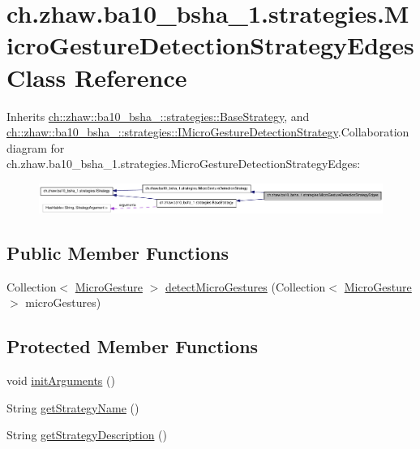 \hypertarget{classch_1_1zhaw_1_1ba10__bsha__1_1_1strategies_1_1MicroGestureDetectionStrategyEdges}{
\section{ch.zhaw.ba10\_\-bsha\_\-1.strategies.MicroGestureDetectionStrategyEdges Class Reference}
\label{classch_1_1zhaw_1_1ba10__bsha__1_1_1strategies_1_1MicroGestureDetectionStrategyEdges}
}


Inherits \hyperlink{classch_1_1zhaw_1_1ba10__bsha__1_1_1strategies_1_1BaseStrategy}{ch::zhaw::ba10\_\-bsha\_::strategies::BaseStrategy}, and \hyperlink{interfacech_1_1zhaw_1_1ba10__bsha__1_1_1strategies_1_1IMicroGestureDetectionStrategy}{ch::zhaw::ba10\_\-bsha\_::strategies::IMicroGestureDetectionStrategy}.Collaboration diagram for ch.zhaw.ba10\_\-bsha\_\-1.strategies.MicroGestureDetectionStrategyEdges:\nopagebreak
\begin{figure}[H]
\begin{center}
\leavevmode
\includegraphics[width=400pt]{classch_1_1zhaw_1_1ba10__bsha__1_1_1strategies_1_1MicroGestureDetectionStrategyEdges__coll__graph}
\end{center}
\end{figure}
\subsection*{Public Member Functions}
\begin{DoxyCompactItemize}
\item 
Collection$<$ \hyperlink{classch_1_1zhaw_1_1ba10__bsha__1_1_1service_1_1MicroGesture}{MicroGesture} $>$ \hyperlink{classch_1_1zhaw_1_1ba10__bsha__1_1_1strategies_1_1MicroGestureDetectionStrategyEdges_a16cd0b9ef604ba14a7eb573a77966c4f}{detectMicroGestures} (Collection$<$ \hyperlink{classch_1_1zhaw_1_1ba10__bsha__1_1_1service_1_1MicroGesture}{MicroGesture} $>$ microGestures)
\end{DoxyCompactItemize}
\subsection*{Protected Member Functions}
\begin{DoxyCompactItemize}
\item 
void \hyperlink{classch_1_1zhaw_1_1ba10__bsha__1_1_1strategies_1_1MicroGestureDetectionStrategyEdges_a81df19fe3c91ea915592918c082ceb5d}{initArguments} ()
\item 
String \hyperlink{classch_1_1zhaw_1_1ba10__bsha__1_1_1strategies_1_1MicroGestureDetectionStrategyEdges_a7ae8347737b8180278eb34f6d5cbba1d}{getStrategyName} ()
\item 
String \hyperlink{classch_1_1zhaw_1_1ba10__bsha__1_1_1strategies_1_1MicroGestureDetectionStrategyEdges_ae0338811d57c4b4b96705b71c5edfc43}{getStrategyDescription} ()
\end{DoxyCompactItemize}
